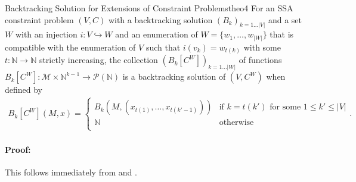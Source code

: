\begin{theorem}{Backtracking Solution for Extensions of Constraint Problems}{theo4}
    For an SSA constraint problem $(V,C)$ with a backtracking
    solution $(B_k)_{k=1\dots |V|}$ and a set $W$ with an injection
    $i:V\hookrightarrow W$ and an enumeration of $W=\{w_1,\dots,w_{|W|}\}$ that
    is compatible with the enumeration of $V$ such that $i(v_k)=w_{t(k)}$ with
    some $t:\mathbb N\rightarrow\mathbb N$ strictly increasing, the collection
    $(B_k[C^W])_{k=1\dots |W|}$ of functions
    $B_k[C^W]\colon\mathcal M\times\mathbb N^{k-1}\rightarrow\mathcal P(\mathbb N)$
    is a backtracking solution of $(V,C^W)$ when defined by
    \begin{align*}
        B_k[C^W](M,x)=\left\{
            \begin{array}{ll}
                B_k\left(M,\left(x_{t(1)},\dots,x_{t(k'-1)}\right)\right)&\text{if }k=t(k')\text{ for some }1\leq k'\leq|V|\\
                \mathbb N&\text{otherwise}\\
            \end{array}\right..
    \end{align*}
    \tcblower
    \paragraph*{Proof:}
    This follows immediately from  and .
\end{theorem}
